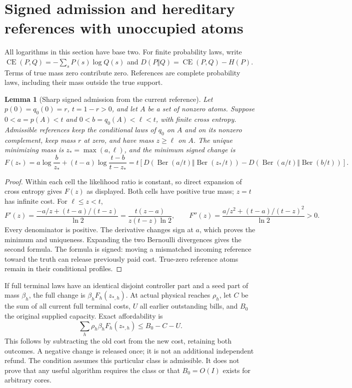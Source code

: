 \documentclass[11pt]{article}
\newtheorem{lemma}{Lemma}
\begin{document}
\section{Signed admission and hereditary references with unoccupied atoms}
\label{sec:v11}
All logarithms in this section have base two. For finite probability laws, write
$\operatorname{CE}(P,Q)=-\sum_sP(s)\log Q(s)$ and
$D(P\Vert Q)=\operatorname{CE}(P,Q)-H(P)$. Terms of true mass zero contribute zero.
References are complete probability laws, including their mass outside the true support.

\begin{lemma}[Sharp signed admission from the current reference]
\label{lem:v11-floor}
Let $p(0)=q_0(0)=r$, $t=1-r>0$, and let $A$ be a set of nonzero atoms.
Suppose $0<a=p(A)<t$ and $0<b=q_0(A)<\ell<t$, with finite cross entropy.
Admissible references keep the conditional laws of $q_0$ on $A$ and on its
nonzero complement, keep mass $r$ at zero, and have mass $z\geq\ell$ on $A$.
The unique minimizing mass is $z_* =\max(a,\ell)$, and the minimum signed change is
\[
 F(z_*)=a\log\frac b{z_*}+(t-a)\log\frac{t-b}{t-z_*}
 =t\left[D(\operatorname{Ber}(a/t)\Vert\operatorname{Ber}(z_*/t))
 -D(\operatorname{Ber}(a/t)\Vert\operatorname{Ber}(b/t))\right].
\]
\end{lemma}
\begin{proof}
Within each cell the likelihood ratio is constant, so direct expansion of cross entropy
gives $F(z)$ as displayed. Both cells have positive true mass; $z=t$ has infinite cost.
For $\ell\leq z<t$,
\[
 F'(z)=\frac{-a/z+(t-a)/(t-z)}{\ln2}
       =\frac{t(z-a)}{z(t-z)\ln2},\qquad
 F''(z)=\frac{a/z^2+(t-a)/(t-z)^2}{\ln2}>0.
\]
Every denominator is positive. The derivative changes sign at $a$, which proves the
minimum and uniqueness. Expanding the two Bernoulli divergences gives the second formula.
The formula is signed: moving a mismatched incoming reference toward the truth can release
previously paid cost. True-zero reference atoms remain in their conditional profiles.
\end{proof}

If full terminal laws have an identical disjoint controller part and a seed part of mass
$\beta_h$, the full change is $\beta_h F_h(z_{*,h})$. At actual physical reaches $\rho_h$,
let $C$ be the sum of all current full terminal costs, $U$ all earlier outstanding bills,
and $B_0$ the original supplied capacity. Exact affordability is
\[
 \sum_h\rho_h\beta_h F_h(z_{*,h})\leq B_0-C-U.
\]
This follows by subtracting the old cost from the new cost, retaining both outcomes.
A negative change is released once; it is not an additional independent refund.
The condition assumes this particular class is admissible. It does not prove that any
useful algorithm requires the class or that $B_0=O(I)$ exists for arbitrary cores.
\end{document}
